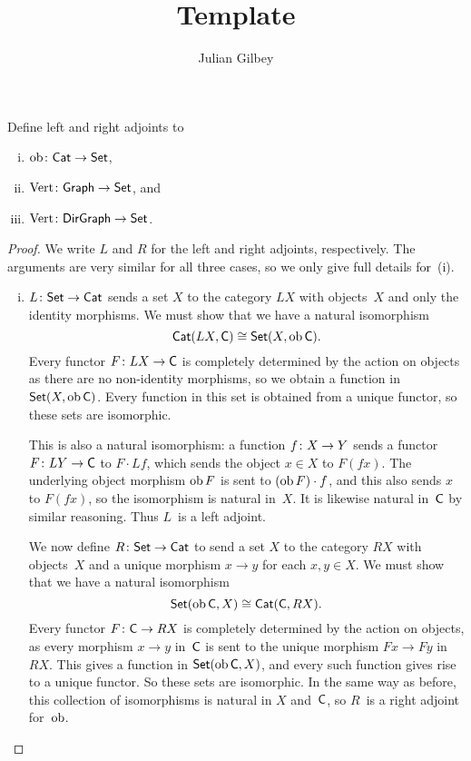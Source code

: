 \documentclass[../../solutions]{subfiles}
\title{Template}
\author{Julian Gilbey}
\begin{document}
\maketitle

\begin{exercise}
  Define left and right adjoints to
  \begin{enumerate}[(i)]
  \item ${\operatorname{ob}}\colon{\textsf{Cat}}\to{\textsf{Set}}$,
  \item ${\text{Vert}}\colon{\textsf{Graph}}\to{\textsf{Set}}$, and
  \item ${\text{Vert}}\colon{\textsf{DirGraph}}\to{\textsf{Set}}$.
  \end{enumerate}
\end{exercise}

\begin{proof}
  We write $L$ and $R$ for the left and right adjoints, respectively.
  The arguments are very similar for all three cases, so we only give
  full details for~(i).

  \begin{enumerate}[(i)]
  \item ${L}\colon{\textsf{Set}}\to{\textsf{Cat}}$ sends a set $X$ to the category $LX$
    with objects~$X$ and only the identity morphisms.  We must show
    that we have a natural isomorphism
    $$\textsf{Cat}(LX, \mathsf{C}) \cong \textsf{Set}(X, \operatorname{ob}\mathsf{C}).$$
    Every functor ${F}\colon{LX}\to{\mathsf{C}}$ is completely determined by the
    action on objects as there are no non-identity morphisms, so we
    obtain a function in $\textsf{Set}(X, \operatorname{ob}\mathsf{C})$.  Every function in this
    set is obtained from a unique functor, so these sets are
    isomorphic.

    This is also a natural isomorphism: a function ${f}\colon{X}\to{Y}$
    sends a functor ${F}\colon{LY}\to{\mathsf{C}}$ to $F\cdot Lf$, which sends the
    object $x\in X$ to $F(fx)$.  The underlying object morphism
    $\operatorname{ob} F$ is sent to $(\operatorname{ob} F)\cdot f$, and this also sends $x$ to
    $F(fx)$, so the isomorphism is natural in~$X$.  It is likewise
    natural in~$\mathsf{C}$ by similar reasoning.  Thus $L$~is a left
    adjoint.

    We now define ${R}\colon{\textsf{Set}}\to{\textsf{Cat}}$ to send a set $X$ to the
    category $RX$ with objects~$X$ and a unique morphism $x\to y$ for
    each $x,y\in X$.  We must show that we have a natural isomorphism
    $$\textsf{Set}(\operatorname{ob}\mathsf{C}, X) \cong \textsf{Cat}(\mathsf{C}, RX).$$
    Every functor ${F}\colon{\mathsf{C}}\to{RX}$ is completely determined by the
    action on objects, as every morphism $x\to y$ in~$\mathsf{C}$ is sent to
    the unique morphism $Fx\to Fy$ in~$RX$.  This gives a function in
    $\textsf{Set}(\operatorname{ob}\mathsf{C}, X)$, and every such function gives rise to a unique
    functor.  So these sets are isomorphic.  In the same way as
    before, this collection of isomorphisms is natural in $X$
    and~$\mathsf{C}$, so $R$~is a right adjoint for~$\operatorname{ob}$.


\end{enumerate}
\end{proof}
\end{document}

